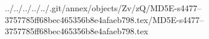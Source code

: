 ../../../../../.git/annex/objects/Zv/zQ/MD5E-s4477--3757785ff68bec465356b8e4afaeb798.tex/MD5E-s4477--3757785ff68bec465356b8e4afaeb798.tex